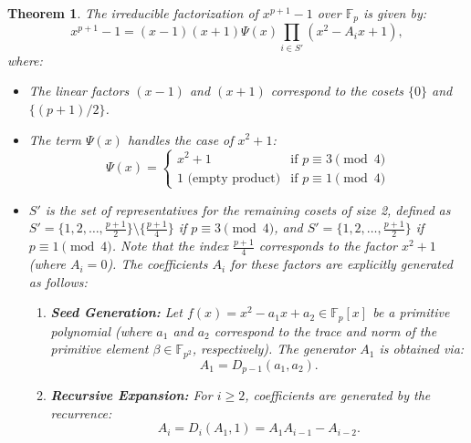 \documentclass[10pt,a4paper]{amsart}
\newtheorem{thm}{Theorem}
\begin{document}
\begin{thm}\label{thm:base_factorization}
The irreducible factorization of $x^{p+1}-1$ over $\mathbb{F}_p$ is given by:
\begin{equation}
x^{p+1}-1 = (x-1)(x+1) \Psi(x) \prod_{i \in S'} (x^2 - A_i x + 1),
\end{equation}
where:
\begin{itemize}
    \item The linear factors $(x-1)$ and $(x+1)$ correspond to the cosets $\{0\}$ and $\{(p+1)/2\}$.
    \item The term $\Psi(x)$ handles the case of $x^2+1$:
    $$ \Psi(x) = \begin{cases} x^2+1 & \text{if } p \equiv 3 \pmod 4 \\ \text{1 (empty product)} & \text{if } p \equiv 1 \pmod 4 \end{cases} $$
    \item $S'$ is the set of representatives for the remaining cosets of size 2, defined as $S' = \{1, 2, \dots, \frac{p+1}{2}\} \setminus \{\frac{p+1}{4}\}$ if $p \equiv 3 \pmod 4$, and $S' = \{1, 2, \dots, \frac{p+1}{2}\}$ if $p \equiv 1 \pmod 4$. Note that the index $\frac{p+1}{4}$ corresponds to the factor $x^2+1$ (where $A_i=0$). The coefficients $A_i$ for these factors are explicitly generated as follows:
    \begin{enumerate}
        \item \textbf{Seed Generation:} Let $f(x) = x^2 - a_1 x + a_2 \in \mathbb{F}_p[x]$ be a primitive polynomial (where $a_1$ and $a_2$ correspond to the trace and norm of the primitive element $\beta \in \mathbb{F}_{p^2}$, respectively). The generator $A_1$ is obtained via:
        $$A_1 = D_{p-1}(a_1, a_2).$$
        \item \textbf{Recursive Expansion:} For $i \ge 2$, coefficients are generated by the recurrence:
        $$A_i = D_i(A_1, 1) = A_1 A_{i-1} - A_{i-2}.$$
    \end{enumerate}
\end{itemize}
\end{thm}
\end{document}
